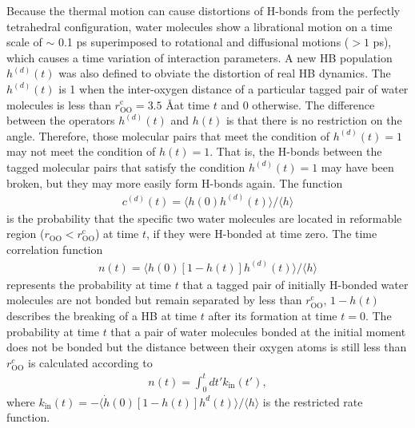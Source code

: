 Because the thermal motion can cause distortions of H-bonds from the perfectly tetrahedral configuration,
water molecules show a librational motion on a time scale of $\sim$ 0.1 ps superimposed to rotational and diffusional motions ($> 1$ ps), 
which causes a time variation of interaction parameters.
A new HB population $h^{(d)}(t)$ was also defined to obviate the distortion of real HB dynamics\cite{Sciortino1989,Chandra2000}.
The $h^{(d)}(t)$ is 1 when the inter-oxygen distance of a particular tagged pair of water molecules is less than $r^{\text{c}}_{\text{OO}}=3.5$ \AA at time $t$ and 0 otherwise. 
The difference between the operators $h^{(d)}(t)$ and $h(t)$ is that there is no restriction on the angle. Therefore, those molecular pairs that meet the condition of $h^{(d)}(t)=1$ may not meet the condition of $h(t)=1$.
That is, the H-bonds between the tagged molecular pairs that satisfy the condition $h^{(d)}(t)=1$ may have been broken, but they may more easily form H-bonds again.
The function 
\begin{eqnarray}
  c^{(d)}(t)=\langle h(0)h^{(d)}(t) \rangle/\langle h\rangle
\label{eq:C_HB_d}
\end{eqnarray}
is the probability that the specific two water molecules are located in reformable region ($r_{\text{OO}} < r^{\text{c}}_{\text{OO}}$) at time $t$,
if they were H-bonded at time zero. 
The time correlation function 
%
\begin{eqnarray}
n(t)=\langle h(0)[1-h(t)]h^{(d)}(t) \rangle/\langle h\rangle 
\label{eq:n_HB}
\end{eqnarray}
represents the probability at time $t$ 
that a tagged pair of initially H-bonded water molecules are not bonded but remain separated by less than $r_{\text{OO}}^{\text{c}}$,
$1-h(t)$ describes the breaking of a HB at time $t$ after its formation at time $t=0$.
The probability at time $t$ that a pair of water molecules bonded at the initial moment does not be bonded 
but the distance between their oxygen atoms is still less than $r_\text{OO}^c$ is calculated according to 
\begin{eqnarray}
n(t) = \int_0^t dt'k_\text{in}(t'),
\label{eq:n_from_k_in}
\end{eqnarray}
where $k_\text{in}(t) = -\langle \dot h(0)[1-h(t)]h^d(t) \rangle/\langle h\rangle$ is the restricted rate function. 
\FloatBarrier
